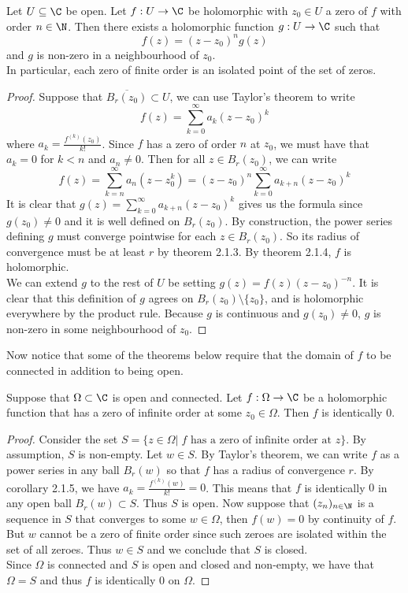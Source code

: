 \documentclass[a4paper]{article}
\begin{document}
\begin{thm}{}{} Let $U\subseteq\C$ be open. Let $f:U\to\C$ be holomorphic with $z_0\in U$ a zero of $f$ with order $n\in\N$. Then there exists a holomorphic function $g:U\to\C$ such that $$f(z)=(z-z_0)^ng(z)$$ and $g$ is non-zero in a neighbourhood of $z_0$. \\

In particular, each zero of finite order is an isolated point of the set of zeros. 
\begin{proof}
Suppose that $\overline{B_r(z_0)}\subset U$, we can use Taylor's theorem to write $$f(z)=\sum_{k=0}^\infty a_k(z-z_0)^k$$ where $a_k=\frac{f^{(k)}(z_0)}{k!}$. Since $f$ has a zero of order $n$ at $z_0$, we must have that $a_k=0$ for $k<n$ and $a_n\neq 0$. Then for all $z\in B_r(z_0)$, we can write $$f(z)=\sum_{k=n}^\infty a_n(z-z_0^k)=(z-z_0)^n\sum_{k=0}^\infty a_{k+n}(z-z_0)^k$$ It is clear that $g(z)=\sum_{k=0}^\infty a_{k+n}(z-z_0)^k$ gives us the formula since $g(z_0)\neq 0$ and it is well defined on $B_r(z_0)$. By construction, the power series defining $g$ must converge pointwise for each $z\in B_r(z_0)$. So its radius of convergence must be at least $r$ by theorem 2.1.3. By theorem 2.1.4, $f$ is holomorphic. \\

We can extend $g$ to the rest of $U$ be setting $g(z)=f(z)(z-z_0)^{-n}$. It is clear that this definition of $g$ agrees on $B_r(z_0)\setminus\{z_0\}$, and is holomorphic everywhere by the product rule. Because $g$ is continuous and $g(z_0)\neq 0$, $g$ is non-zero in some neighbourhood of $z_0$. 
\end{proof}
\end{thm}

Now notice that some of the theorems below require that the domain of $f$ to be connected in addition to being open. 

\begin{thm}{}{} Suppose that $\Omega\subset\C$ is open and connected. Let $f:\Omega\to\C$ be a holomorphic function that has a zero of infinite order at some $z_0\in\Omega$. Then $f$ is identically $0$. 
\begin{proof}
Consider the set $S=\{z\in\Omega|\; f\text{ has a zero of infinite order at }z\}$. By assumption, $S$ is non-empty. Let $w\in S$. By Taylor's theorem, we can write $f$ as a power series in any ball $B_r(w)$ so that $f$ has a radius of convergence $r$. By corollary 2.1.5, we have $a_k=\frac{f^{(k)}(w)}{k!}=0$. This means that $f$ is identically $0$ in any open ball $B_r(w)\subset S$. Thus $S$ is open. Now suppose that $(z_n)_{n\in\N}$ is a sequence in $S$ that converges to some $w\in\Omega$, then $f(w)=0$ by continuity of $f$. But $w$ cannot be a zero of finite order since such zeroes are isolated within the set of all zeroes. Thus $w\in S$ and we conclude that $S$ is closed. \\

Since $\Omega$ is connected and $S$ is open and closed and non-empty, we have that $\Omega=S$ and thus $f$ is identically $0$ on $\Omega$. 
\end{proof}
\end{thm}
\end{document}
